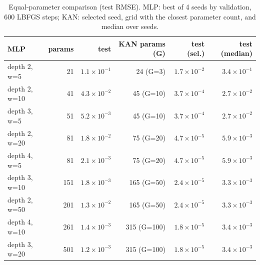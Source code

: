 \begin{table}[t]
\caption{Equal-parameter comparison (test RMSE). MLP: best of 4 seeds by validation, 600 LBFGS steps; KAN: selected seed, grid with the closest parameter count, and median over seeds.}\label{tab:mlp}
\centering\footnotesize
\begin{tabular}{lrrrrr}
\toprule
MLP & params & test & KAN params (G) & test (sel.) & test (median) \\
\midrule
depth 2, w=5 & 21 & $1.1\!\times\!10^{-1}$ & 24 (G=3) & $1.7\!\times\!10^{-2}$ & $3.4\!\times\!10^{-1}$ \\
depth 2, w=10 & 41 & $4.3\!\times\!10^{-2}$ & 45 (G=10) & $3.7\!\times\!10^{-4}$ & $2.7\!\times\!10^{-2}$ \\
depth 3, w=5 & 51 & $5.2\!\times\!10^{-3}$ & 45 (G=10) & $3.7\!\times\!10^{-4}$ & $2.7\!\times\!10^{-2}$ \\
depth 2, w=20 & 81 & $1.8\!\times\!10^{-2}$ & 75 (G=20) & $4.7\!\times\!10^{-5}$ & $5.9\!\times\!10^{-3}$ \\
depth 4, w=5 & 81 & $2.1\!\times\!10^{-3}$ & 75 (G=20) & $4.7\!\times\!10^{-5}$ & $5.9\!\times\!10^{-3}$ \\
depth 3, w=10 & 151 & $1.8\!\times\!10^{-3}$ & 165 (G=50) & $2.4\!\times\!10^{-5}$ & $3.3\!\times\!10^{-3}$ \\
depth 2, w=50 & 201 & $1.3\!\times\!10^{-2}$ & 165 (G=50) & $2.4\!\times\!10^{-5}$ & $3.3\!\times\!10^{-3}$ \\
depth 4, w=10 & 261 & $1.4\!\times\!10^{-3}$ & 315 (G=100) & $1.8\!\times\!10^{-5}$ & $3.4\!\times\!10^{-3}$ \\
depth 3, w=20 & 501 & $1.2\!\times\!10^{-3}$ & 315 (G=100) & $1.8\!\times\!10^{-5}$ & $3.4\!\times\!10^{-3}$ \\
\bottomrule
\end{tabular}
\end{table}

